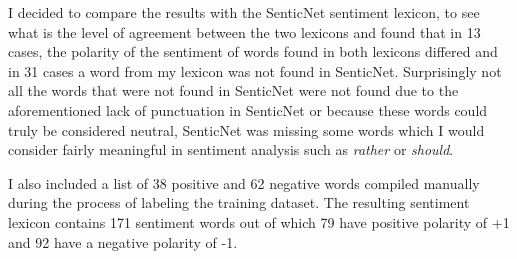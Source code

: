I decided to compare the results with the SenticNet sentiment lexicon, to see what is the level of agreement between the two lexicons and found that in 13 cases, the polarity of the sentiment of words found in both lexicons differed and in 31 cases a word from my lexicon was not found in SenticNet. Surprisingly not all the words that were not found in SenticNet were not found due to the aforementioned lack of punctuation in SenticNet or because these words could truly be considered neutral, SenticNet was missing some words which I would consider fairly meaningful in sentiment analysis such as \textit{rather} or \textit{should}.

I also included a list of 38 positive and 62 negative words compiled manually during the process of labeling the training dataset. The resulting sentiment lexicon contains 171 sentiment words out of which 79 have positive polarity of +1 and 92 have a negative polarity of -1.



